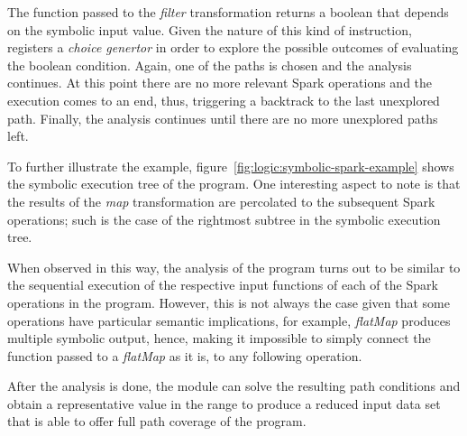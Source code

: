 The function passed to the \textit{filter} transformation returns a boolean that depends on the symbolic input value. Given the nature of this kind of instruction, \spf{} registers a \textit{choice genertor} in order to explore the possible outcomes of evaluating the boolean condition. Again, one of the paths is chosen and the analysis continues. At this point there are no more relevant Spark operations and the execution comes to an end, thus, triggering a backtrack to the last unexplored path. Finally, the analysis continues until there are no more unexplored paths left.

To further illustrate the example, figure~\ref{fig:logic:symbolic-spark-example} shows the symbolic execution tree of the program. One interesting aspect to note is that the results of the \textit{map} transformation are percolated to the subsequent Spark operations; such is the case of the rightmost subtree in the symbolic execution tree. 

When observed in this way, the analysis of the program turns out to be similar to the sequential execution of the respective input functions of each of the Spark operations in the program. However, this is not always the case given that some operations have particular semantic implications, for example, \textit{flatMap} produces multiple symbolic output, hence, making it impossible to simply connect the function passed to a \textit{flatMap} as it is, to any following operation.

After the analysis is done, the module can solve the resulting path conditions and obtain a representative value in the range to produce a reduced input data set that is able to offer full path coverage of the program.


